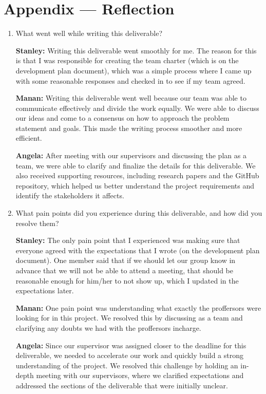 \documentclass{article}
\begin{document}
\newpage{}

\section*{Appendix --- Reflection}

\begin{enumerate}
    \item What went well while writing this deliverable? 
    
\textbf{Stanley:} Writing this deliverable went smoothly for me. The reason for this is that I was responsible for creating the team charter (which is on the development plan document), which was a simple process where I came up with some reasonable responses and checked in to see if my team agreed.

\textbf{Manan:} Writing this deliverable went well because our team was able to communicate effectively and divide the work equally. We were able to discuss our ideas and come to a consensus on how to approach the problem statement and goals. This made the writing process smoother and more efficient.

\textbf{Angela:} After meeting with our supervisors and discussing the plan as a team, we were able to clarify and finalize the details for this deliverable. We also received supporting resources, including research papers and the GitHub repository, which helped us better understand the project requirements and identify the stakeholders it affects.

    \item What pain points did you experience during this deliverable, and how
    did you resolve them?

\textbf{Stanley:} The only pain point that I experienced was making sure that everyone agreed with the expectations that I wrote (on the development plan document). One member said that if we should let our group know in advance that we will not be able to attend a meeting, that should be reasonable enough for him/her to not show up, which I updated in the expectations later.  

\textbf{Manan:} One pain point was understanding what exactly the proffersors were looking for in this project. We resolved this by discussing as a team and clarifying any doubts we had with the proffersors incharge. 

\textbf{Angela:} Since our supervisor was assigned closer to the deadline for this deliverable, we needed to accelerate our work and quickly build a strong understanding of the project. We resolved this challenge by holding an in-depth meeting with our supervisors, where we clarified expectations and addressed the sections of the deliverable that were initially unclear.


\end{enumerate}
\end{document}
